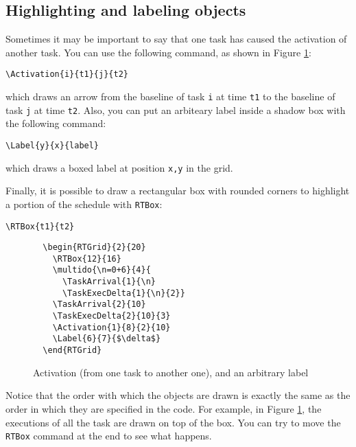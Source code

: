 \documentclass{article}
\begin{document}
\subsection{Highlighting and labeling objects}

Sometimes it may be important to say that one task has caused the
activation of another task. You can use the following command, as
shown in Figure \ref{fig:ex3a}:
\begin{verbatim}
\Activation{i}{t1}{j}{t2}
\end{verbatim}
which draws an arrow from the baseline of task \texttt{i} at time
\texttt{t1} to the baseline of task \texttt{j} at time \texttt{t2}.
Also, you can put an arbiteary label inside a shadow box with the
following command:
\begin{verbatim}
\Label{y}{x}{label}
\end{verbatim}
which draws a boxed label at position \texttt{x,y} in the grid.

Finally, it is possible to draw a rectangular box with rounded corners
to highlight a portion of the schedule with \texttt{RTBox}:
\begin{verbatim}
\RTBox{t1}{t2}
\end{verbatim}

\begin{figure}[h]
  \centering
  \begin{RTGrid}{2}{20}
  \end{RTGrid}
\begin{verbatim}
  \begin{RTGrid}{2}{20}
    \RTBox{12}{16}
    \multido{\n=0+6}{4}{
      \TaskArrival{1}{\n}
      \TaskExecDelta{1}{\n}{2}}
    \TaskArrival{2}{10}
    \TaskExecDelta{2}{10}{3}
    \Activation{1}{8}{2}{10}
    \Label{6}{7}{$\delta$}
  \end{RTGrid}
\end{verbatim}
  \caption{Activation (from one task to another one), and an arbitrary label}
  \label{fig:ex3a}
\end{figure}

Notice that the order with which the objects are drawn is exactly the
same as the order in which they are specified in the code. For
example, in Figure \ref{fig:ex3a}, the executions of all the task are
drawn on top of the box. You can try to move the \texttt{RTBox}
command at the end to see what happens.
\end{document}
